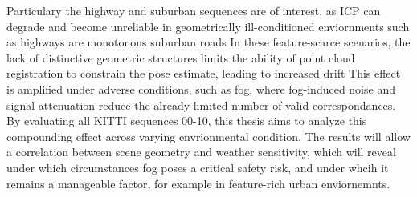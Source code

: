 \begin{table}[h]
\centering
\caption{Properties of KITTI Odometry Sequences 00--10~\cite{noauthor_kitti_nodate}}
\label{tab:kitti_sequences}
\end{table}

Particulary the highway and suburban sequences are of interest, as ICP can degrade and become unreliable in geometrically ill-conditioned enviornments such as highways are monotonous suburban roads %
In these feature-scarce scenarios, the lack of distinctive geometric structures limits the ability of point cloud registration to constrain the pose estimate, leading to increased drift %
This effect is amplified under adverse conditions, such as fog, where fog-induced noise and signal attenuation reduce the already limited number of valid correspondances. By evaluating all KITTI sequences 00-10, this thesis aims to analyze this compounding effect across varying envrionmental condition. The results will allow a correlation between scene geometry and weather sensitivity, which will reveal under which circumstances fog poses a critical safety risk, and under whcih it remains a manageable factor, for example in feature-rich urban enviornemnts.  

